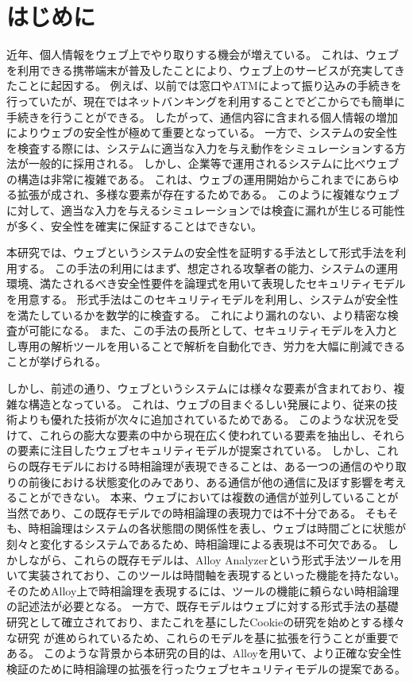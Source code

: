 \documentclass[12pt,a4paper]{jbook}
\begin{document}
\chapter{はじめに}
近年、個人情報をウェブ上でやり取りする機会が増えている。
これは、ウェブを利用できる携帯端末が普及したことにより、ウェブ上のサービスが充実してきたことに起因する。
例えば、以前では窓口やATMによって振り込みの手続きを行っていたが、現在ではネットバンキングを利用することでどこからでも簡単に手続きを行うことができる。
したがって、通信内容に含まれる個人情報の増加によりウェブの安全性が極めて重要となっている。
一方で、システムの安全性を検査する際には、システムに適当な入力を与え動作をシミュレーションする方法が一般的に採用される。
しかし、企業等で運用されるシステムに比べウェブの構造は非常に複雑である。
これは、ウェブの運用開始からこれまでにあらゆる拡張が成され、多様な要素が存在するためである。
このように複雑なウェブに対して、適当な入力を与えるシミュレーションでは検査に漏れが生じる可能性が多く、安全性を確実に保証することはできない。

本研究では、ウェブというシステムの安全性を証明する手法として形式手法を利用する。
この手法の利用にはまず、想定される攻撃者の能力、システムの運用環境、満たされるべき安全性要件を論理式を用いて表現したセキュリティモデルを用意する。
形式手法はこのセキュリティモデルを利用し、システムが安全性を満たしているかを数学的に検査する。
これにより漏れのない、より精密な検査が可能になる。
また、この手法の長所として、セキュリティモデルを入力とし専用の解析ツールを用いることで解析を自動化でき、労力を大幅に削減できることが挙げられる。

しかし、前述の通り、ウェブというシステムには様々な要素が含まれており、複雑な構造となっている。
これは、ウェブの目まぐるしい発展により、従来の技術よりも優れた技術が次々に追加されているためである。
このような状況を受けて、これらの膨大な要素の中から現在広く使われている要素を抽出し、それらの要素に注目したウェブセキュリティモデルが提案されている\cite{based-model,cookie-model}。
しかし、これらの既存モデルにおける時相論理が表現できることは、ある一つの通信のやり取りの前後における状態変化のみであり、ある通信が他の通信に及ぼす影響を考えることができない。
本来、ウェブにおいては複数の通信が並列していることが当然であり、この既存モデルでの時相論理の表現力では不十分である。
そもそも、時相論理はシステムの各状態間の関係性を表し、ウェブは時間ごとに状態が刻々と変化するシステムであるため、時相論理による表現は不可欠である。
しかしながら、これらの既存モデル\cite{based-model,cookie-model}は、Alloy Analyzerという形式手法ツールを用いて実装されており、このツールは時間軸を表現するといった機能を持たない。
そのためAlloy上で時相論理を表現するには、ツールの機能に頼らない時相論理の記述法が必要となる。
一方で、既存モデル\cite{based-model}はウェブに対する形式手法の基礎研究として確立されており、またこれを基にしたCookieの研究\cite{cookie-model}を始めとする様々な研究
が進められているため、これらのモデルを基に拡張を行うことが重要である。
このような背景から本研究の目的は、Alloyを用いて、より正確な安全性検証のために時相論理の拡張を行ったウェブセキュリティモデルの提案である。
\end{document}
